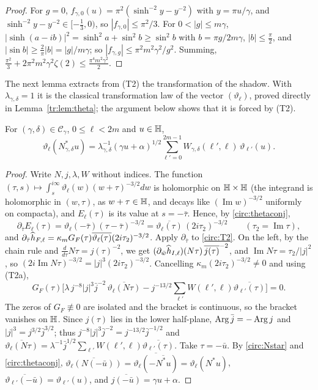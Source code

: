 \begin{proof}
For $g=0$, $f_{\gamma,0}(u)=\pi^2(\sinh^{-2}y-y^{-2})$ with $y=\pi u/\gamma$, and $\sinh^{-2}y-y^{-2}\in[-\frac13,0)$, so $|f_{\gamma,0}|\le\pi^2/3$. For $0<|g|\le m\gamma$, $|\sinh(a-ib)|^2=\sinh^2a+\sin^2b\ge\sin^2b$ with $b=\pi g/2m\gamma$, $|b|\le\frac\pi2$, and $|\sin b|\ge\frac2\pi|b|=|g|/m\gamma$; so $|f_{\gamma,g}|\le\pi^2m^2\gamma^2/g^2$. Summing, $\frac{\pi^2}3+2\pi^2m^2\gamma^2\zeta(2)\le\frac{\pi^4m^2\gamma^2}2$.
\end{proof}

The next lemma extracts from (T2) the transformation of the shadow. With $\lambda_{\gamma,\delta}=1$ it is the classical transformation law of the vector $(\vartheta_\ell)$, proved directly in Lemma~\ref{tr:lem:theta}; the argument below shows that it is forced by (T2).

\begin{lemma}\label{circ:lem:theta}
For $(\gamma,\delta)\in\mathcal C_\gamma$, $0\le\ell<2m$ and $u\in\mathbb{H}$,
\[
\vartheta_\ell(N^*_{\gamma,\delta}u)=\lambda_{\gamma,\delta}^{-1}(\gamma u+\alpha)^{1/2}\sum_{\ell'=0}^{2m-1}W_{\gamma,\delta}(\ell',\ell)\,\vartheta_{\ell'}(u).
\]
\end{lemma}

\begin{proof}
Write $N,j,\lambda,W$ without indices. The function $(\tau,s)\mapsto\int_s^{i\infty}\vartheta_\ell(w)(w+\tau)^{-3/2}dw$ is holomorphic on $\mathbb{H}\times\mathbb{H}$ (the integrand is holomorphic in $(w,\tau)$, as $w+\tau\in\mathbb{H}$, and decays like $(\operatorname{Im}w)^{-3/2}$ uniformly on compacta), and $E_\ell(\tau)$ is its value at $s=-\bar\tau$. Hence, by \eqref{circ:thetaconj},
\[
\partial_{\bar\tau}E_\ell(\tau)=\vartheta_\ell(-\bar\tau)(\tau-\bar\tau)^{-3/2}=\overline{\vartheta_\ell(\tau)}\,(2i\tau_2)^{-3/2}\qquad(\tau_2=\operatorname{Im}\tau),
\]
and $\partial_{\bar\tau}\widehat h_{F,\ell}=\kappa_mG_F(\tau)\overline{\vartheta_\ell(\tau)}(2i\tau_2)^{-3/2}$. Apply $\partial_{\bar\tau}$ to \eqref{circ:T2}. On the left, by the chain rule and $\frac{d}{d\tau}N\tau=j(\tau)^{-2}$, we get $(\partial_{\bar w}\widehat h_{I,\ell})(N\tau)\,\overline{j(\tau)}^{-2}$, and $\operatorname{Im}N\tau=\tau_2/|j|^2$, so $(2i\operatorname{Im}N\tau)^{-3/2}=|j|^3(2i\tau_2)^{-3/2}$. Cancelling $\kappa_m(2i\tau_2)^{-3/2}\ne0$ and using (T2a),
\[
G_F(\tau)\Big[\lambda\,j^{-8}|j|^3\bar j^{-2}\,\overline{\vartheta_\ell(N\tau)}-j^{-13/2}\sum_{\ell'}W(\ell',\ell)\overline{\vartheta_{\ell'}(\tau)}\Big]=0 .
\]
The zeros of $G_F\not\equiv0$ are isolated and the bracket is continuous, so the bracket vanishes on $\mathbb{H}$. Since $j(\tau)$ lies in the lower half-plane, $\operatorname{Arg}\bar j=-\operatorname{Arg} j$ and $|j|^3=j^{3/2}\bar j^{3/2}$; thus $j^{-8}|j|^3\bar j^{-2}=j^{-13/2}\bar j^{-1/2}$ and $\overline{\vartheta_\ell(N\tau)}=\lambda^{-1}\bar j^{1/2}\sum_{\ell'}W(\ell',\ell)\overline{\vartheta_{\ell'}(\tau)}$. Take $\tau=-\bar u$. By \eqref{circ:Nstar} and \eqref{circ:thetaconj}, $\overline{\vartheta_\ell(N(-\bar u))}=\overline{\vartheta_\ell(-\overline{N^*u})}=\vartheta_\ell(N^*u)$, $\overline{\vartheta_{\ell'}(-\bar u)}=\vartheta_{\ell'}(u)$, and $\overline{j(-\bar u)}=\gamma u+\alpha$.
\end{proof}

